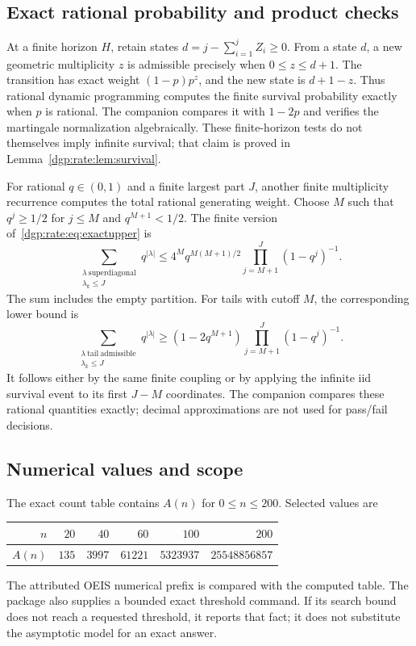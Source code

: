 \documentclass[11pt,letterpaper]{article}
\numberwithin{equation}{section}
\theoremstyle{remark}\newtheorem{remark}[theorem]{Remark}
\begin{document}
\subsection{Exact rational probability and product checks}
At a finite horizon $H$, retain states
$d=j-\sum_{i=1}^j Z_i\geq0$. From a state $d$, a new geometric
multiplicity $z$ is admissible precisely when $0\leq z\leq d+1$.
The transition has exact weight $(1-p)p^z$, and the new state is
$d+1-z$. Thus rational dynamic programming computes the finite survival
probability exactly when $p$ is rational. The companion compares it with
$1-2p$ and verifies the martingale normalization algebraically. These
finite-horizon tests do not themselves imply infinite survival; that
claim is proved in Lemma~\ref{dgp:rate:lem:survival}.

For rational $q\in(0,1)$ and a finite largest part $J$, another finite
multiplicity recurrence computes the total rational generating weight.
Choose $M$ such that $q^j\geq1/2$ for $j\leq M$ and
$q^{M+1}<1/2$. The finite version of~\eqref{dgp:rate:eq:exactupper} is
\begin{equation}\label{dgp:rate:eq:finiteupper}
 \sum_{\substack{\lambda\ \mathrm{superdiagonal}\\\lambda_k\leq J}}
 q^{|\lambda|}
 \leq4^M q^{M(M+1)/2}\prod_{j=M+1}^J(1-q^j)^{-1}.
\end{equation}
The sum includes the empty partition. For tails with cutoff $M$, the
corresponding lower bound is
\begin{equation}\label{dgp:rate:eq:finitelower}
 \sum_{\substack{\lambda\ \mathrm{tail\ admissible}\\\lambda_k\leq J}}
 q^{|\lambda|}
 \geq (1-2q^{M+1})\prod_{j=M+1}^J(1-q^j)^{-1}.
\end{equation}
It follows either by the same finite coupling or by applying the
infinite iid survival event to its first $J-M$ coordinates. The companion
compares these rational quantities exactly; decimal approximations are
not used for pass/fail decisions.

\subsection{Numerical values and scope}
The exact count table contains $A(n)$ for $0\leq n\leq200$. Selected
values are
\begin{center}
\begin{tabular}{rrrrrr}
\toprule
$n$&$20$&$40$&$60$&$100$&$200$\\
\midrule
$A(n)$&$135$&$3997$&$61221$&$5323937$&$25548856857$\\
\bottomrule
\end{tabular}
\end{center}
The attributed OEIS numerical prefix is compared with the computed table.
The package also supplies a bounded exact threshold command. If its
search bound does not reach a requested threshold, it reports that fact;
it does not substitute the asymptotic model for an exact answer.
\end{document}
